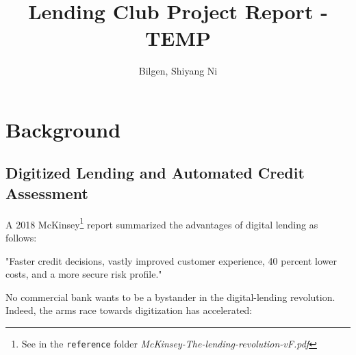 \documentclass[11pt]{article}
\title{Lending Club Project Report - TEMP}
\author{Bilgen, Shiyang Ni}
\begin{document}
\maketitle

\section{Background}

\subsection{Digitized Lending and Automated Credit Assessment}

A 2018 McKinsey\footnote{See in the \texttt{reference} folder \textit{McKinsey-The-lending-revolution-vF.pdf} } report summarized the advantages of digital lending as follows:
\begin{displayquote}
"Faster credit decisions, vastly improved customer experience, 40 percent lower costs, and a more secure risk profile."
\end{displayquote}

No commercial bank wants to be a bystander in the digital-lending revolution. Indeed, the arms race towards digitization has accelerated: 
\end{document}
